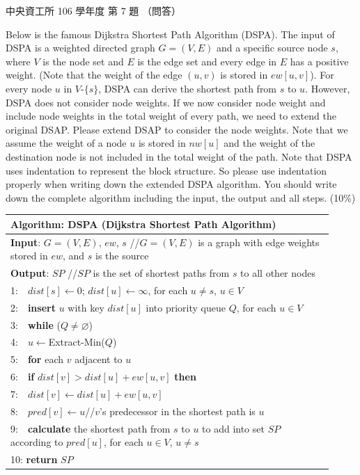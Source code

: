 \begin{pastexam}[label={px:ncu-106-dsa-07}]{中央資工所 106 學年度 第 7 題}
（問答）

Below is the famous Dijkstra Shortest Path Algorithm (DSPA). The input of DSPA is a weighted
directed graph $G=(V, E)$ and a specific source node $s$, where $V$ is the node set and $E$ is the
edge set and every edge in $E$ has a positive weight. (Note that the weight of the edge $(u, v)$ is
stored in $ew[u, v]$). For every node $u$ in $V$-$\{s\}$, DSPA can derive the shortest path from
$s$ to $u$. However, DSPA does not consider node weights. If we now consider node weight and
include node weights in the total weight of every path, we need to extend the original DSAP.
Please extend DSAP to consider the node weights. Note that we assume the weight of a node $u$ is
stored in $nw[u]$ and the weight of the destination node is not included in the total weight of
the path. Note that DSPA uses indentation to represent the block structure. So please use
indentation properly when writing down the extended DSPA algorithm. You should write down the
complete algorithm including the input, the output and all steps. (10\%)

\begin{center}
\small
\begin{tabular}{|p{0.92\linewidth}|}
\hline
\textbf{Algorithm}: DSPA (Dijkstra Shortest Path Algorithm)\\ \hline
\textbf{Input}: $G=(V, E)$, $ew$, $s$ //$G=(V, E)$ is a graph with edge weights stored in $ew$, and $s$ is the source\\
\textbf{Output}: $SP$ //$SP$ is the set of shortest paths from $s$ to all other nodes\\ \hline
1:\ \ $dist[s]\leftarrow 0$; $dist[u]\leftarrow\infty$, for each $u\neq s$, $u\in V$\\
2:\ \ \textbf{insert} $u$ with key $dist[u]$ into priority queue $Q$, for each $u\in V$\\
3:\ \ \textbf{while} ($Q\neq\varnothing$)\\
4:\ \ \hspace*{1.5em}$u\leftarrow$Extract-Min($Q$)\\
5:\ \ \hspace*{1.5em}\textbf{for} each $v$ adjacent to $u$\\
6:\ \ \hspace*{3em}\textbf{if} $dist[v] > dist[u]+ew[u,v]$ \textbf{then}\\
7:\ \ \hspace*{4.5em}$dist[v]\leftarrow dist[u]+ew[u,v]$\\
8:\ \ \hspace*{4.5em}$pred[v]\leftarrow u$\quad //$v$'s predecessor in the shortest path is $u$\\
9:\ \ \textbf{calculate} the shortest path from $s$ to $u$ to add into set $SP$ according to $pred[u]$, for each $u\in V$, $u\neq s$\\
10: \textbf{return} $SP$\\ \hline
\end{tabular}
\end{center}
\end{pastexam}

